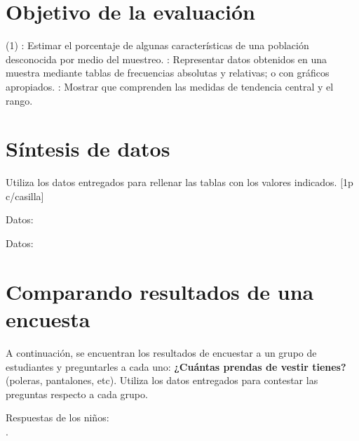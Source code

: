 \documentclass[sin curso]{plantilla-evaluacion-v1}
\begin{document}
\section*{Objetivo de la evaluación}

\begin{tasks}[style=itemize](1)
  : Estimar el porcentaje de algunas características de una
  población desconocida por medio del muestreo.
  : Representar datos obtenidos en una muestra mediante
  tablas de frecuencias absolutas y relativas; o con gráficos apropiados.
  : Mostrar que comprenden las medidas de tendencia central
  y el rango.
\end{tasks}

\section{Síntesis de datos}

Utiliza los datos entregados para rellenar las tablas con los valores indicados. [1p c/casilla]

\begin{preguntas}[after-item-skip=15pt,resume=false]
  \pregunta Datos: 
  \begin{malla}[height=3cm]
  \end{malla}
  \usebox{\tablaQ}\hspace{15pt}\usebox{\tablaM}

  \pregunta Datos: 
  \begin{malla}[height=3cm]
  \end{malla}
  \usebox{\tablaQ}\hspace{15pt}\usebox{\tablaM}
\end{preguntas}

\section{Comparando resultados de una encuesta}

A continuación, se encuentran los resultados de encuestar a un grupo de estudiantes y
preguntarles a cada uno: \textbf{¿Cuántas prendas de vestir tienes?}
(poleras, pantalones, etc). Utiliza los datos entregados para contestar las preguntas
respecto a cada grupo. \par
Respuestas de los niños:\\[5pt]
\hspace*{20pt}.
\end{document}
